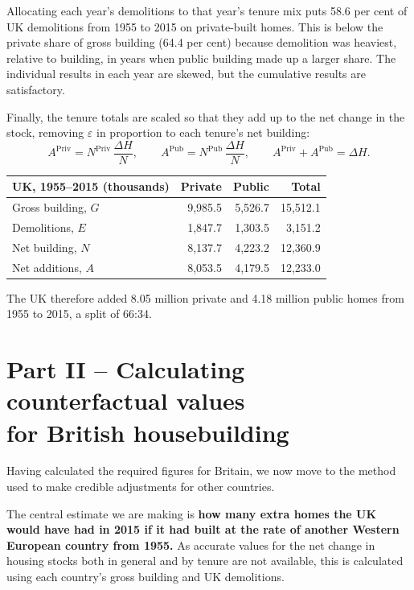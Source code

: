 \documentclass[11pt,a4paper]{article}
\newcommand{\priv}{\mathrm{Priv}}
\newcommand{\pub}{\mathrm{Pub}}
\begin{document}
Allocating each year's demolitions to that year's tenure mix puts 58.6 per cent of UK
demolitions from 1955 to 2015 on private-built homes. This is below the private share of
gross building (64.4 per cent) because demolition was heaviest, relative to building, in
years when public building made up a larger share. The individual results in each year
are skewed, but the cumulative results are satisfactory.

Finally, the tenure totals are scaled so that they add up to the net change in the stock,
removing $\varepsilon$ in proportion to each tenure's net building:
\[
  A^{\priv} = N^{\priv}\,\frac{\Delta H}{N}, \qquad
  A^{\pub}  = N^{\pub}\,\frac{\Delta H}{N}, \qquad
  A^{\priv} + A^{\pub} = \Delta H.
\]

\begin{center}
\begin{tabular}{lrrr}
  \toprule
  UK, 1955--2015 (thousands) & Private & Public & Total\\
  \midrule
  Gross building, $G$  & 9,985.5 & 5,526.7 & 15,512.1\\
  Demolitions, $E$     & 1,847.7 & 1,303.5 &  3,151.2\\
  Net building, $N$    & 8,137.7 & 4,223.2 & 12,360.9\\
  Net additions, $A$   & 8,053.5 & 4,179.5 & 12,233.0\\
  \bottomrule
\end{tabular}
\end{center}

The UK therefore added 8.05 million private and 4.18 million public homes from 1955 to
2015, a split of 66:34.

\section*{Part II -- Calculating counterfactual values\\ for British housebuilding}

Having calculated the required figures for Britain, we now move to the method used to
make credible adjustments for other countries.

The central estimate we are making is \textbf{how many extra homes the UK would have had
in 2015 if it had built at the rate of another Western European country from 1955.} As
accurate values for the net change in housing stocks both in general and by tenure are
not available, this is calculated using each country's gross building and UK demolitions.
\end{document}
